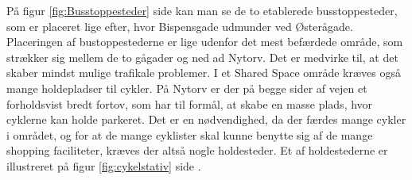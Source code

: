 På figur \cref{fig:Busstoppesteder} side \pageref{fig:Busstoppesteder} kan man se de to etablerede busstoppesteder, som er placeret lige efter, hvor Bispensgade udmunder ved Østerågade. Placeringen af bustoppestederne er lige udenfor det mest befærdede område, som strækker sig mellem de to gågader og ned ad Nytorv. Det er medvirke til, at det skaber mindst mulige trafikale problemer.
I et Shared Space område kræves også mange holdepladser til cykler. På Nytorv er der på begge sider af vejen et forholdsvist bredt fortov, som har til formål, at skabe en masse plads, hvor cyklerne kan holde parkeret. Det er en nødvendighed, da der færdes mange cykler i området, og for at de mange cyklister skal kunne benytte sig af de mange shopping faciliteter, kræves der altså nogle holdesteder. Et af holdestederne er illustreret på figur \cref{fig:cykelstativ} side \pageref{fig:cykelstativ}.
